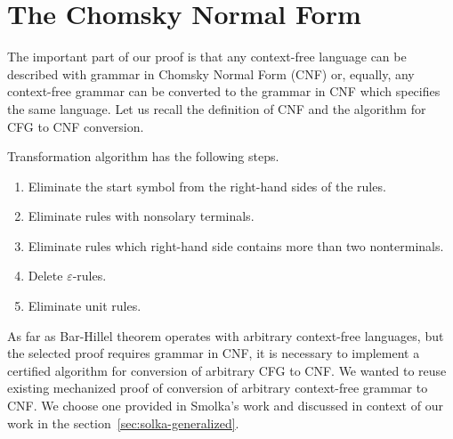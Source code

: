 \section{The Chomsky Normal Form}
\label{sec:cnf}

The important part of our proof is that any context-free language can be described with grammar in Chomsky Normal Form (CNF) or, equally, any context-free grammar can be converted to the grammar in CNF which specifies the same language.
Let us recall the definition of CNF and the algorithm for CFG to CNF conversion.

Transformation algorithm has the following steps.
\begin{enumerate}
\item Eliminate the start symbol from the right-hand sides of the rules.
\item Eliminate rules with nonsolary terminals.
\item Eliminate rules which right-hand side contains more than two nonterminals.
\item Delete $\varepsilon$-rules.
\item Eliminate unit rules.
\end{enumerate}

As far as Bar-Hillel theorem operates with arbitrary context-free languages, but the selected proof requires grammar in CNF, it is necessary to implement a certified algorithm for conversion of arbitrary CFG to CNF.
We wanted to reuse existing mechanized proof of conversion of arbitrary context-free grammar to CNF.
We choose one provided in Smolka's work and discussed in context of our work in the section~\ref{sec:solka-generalized}.




